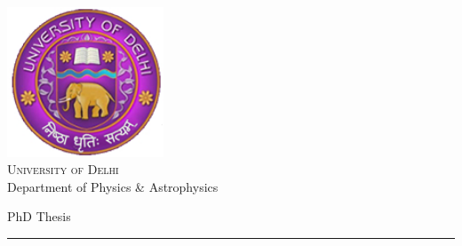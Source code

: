 \begin{titlepage}
	\begin{addmargin}[-1cm]{-1cm}
    \begin{center}
        \large
    \includegraphics[width=0.35\textwidth]{figures/logo_du.jpg}\\
        \vfill
        {\Large \textsc{University of Delhi}}\\[1ex]
        Department of Physics \& Astrophysics\\

        \vfill

        PhD Thesis\\ \vskip1cm
        \rule{14cm}{0.4pt} \\ \bigskip
            \textbf{\Large{\color{Maroon}{Search for Anomalous Gauge Coupling through Vector Boson Scattering and Development of the GEM Detectors at the CMS Experiment}}} \\ \bigskip



\end{center}
\end{addmargin}
\end{titlepage}
